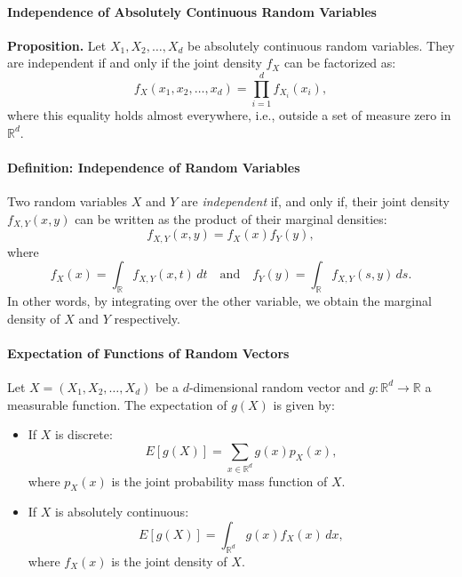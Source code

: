 \paragraph{Independence of Absolutely Continuous Random Variables}
\textbf{Proposition.} Let \( X_1, X_2, \dots, X_d \) be absolutely continuous random variables. They are independent if and only if the joint density \( f_X \) can be factorized as:
\[
f_X(x_1, x_2, \dots, x_d) = \prod_{i=1}^d f_{X_i}(x_i),
\]
where this equality holds almost everywhere, i.e., outside a set of measure zero in \( \mathbb{R}^d \).

\paragraph{Definition: Independence of Random Variables}
Two random variables \(X\) and \(Y\) are \textit{independent} if, and only if, their joint density \( f_{X,Y}(x,y) \) can be written as the product of their marginal densities:
\[
f_{X,Y}(x, y) = f_X(x) f_Y(y),
\]
where
\[
f_X(x) = \int_{\mathbb{R}} f_{X,Y}(x, t) \, dt \quad \text{and} \quad f_Y(y) = \int_{\mathbb{R}} f_{X,Y}(s, y) \, ds.
\]
In other words, by integrating over the other variable, we obtain the marginal density of \(X\) and \(Y\) respectively.

\paragraph{Expectation of Functions of Random Vectors}
Let \(X = (X_1, X_2, \dots, X_d)\) be a \(d\)-dimensional random vector and \(g : \mathbb{R}^d \to \mathbb{R}\) a measurable function. The expectation of \(g(X)\) is given by:
\begin{itemize}
    \item If \(X\) is discrete:
    \[
    E[g(X)] = \sum_{x \in \mathbb{R}^d} g(x) p_X(x),
    \]
    where \(p_X(x)\) is the joint probability mass function of \(X\).
    \item If \(X\) is absolutely continuous:
    \[
    E[g(X)] = \int_{\mathbb{R}^d} g(x) f_X(x) \, dx,
    \]
    where \(f_X(x)\) is the joint density of \(X\).
\end{itemize}

